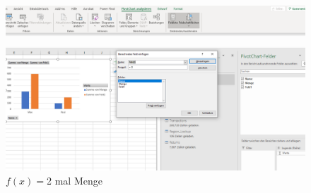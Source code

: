 \begin{figure}[H]
	\centering
	\includegraphics[scale = 0.3]{attachment/chapter_1/screenshot076}
	\caption{$f(x)= $2 mal Menge}
	\label{fig:screenshot076}
\end{figure}

